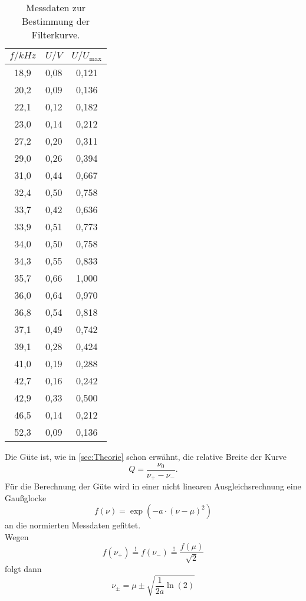 \begin{table}
  \centering
  \caption{Messdaten zur Bestimmung der Filterkurve.}
  \label{tab:filterkurve}
  \begin{tabular}{c c c}
  \toprule
  $f / \si{kHz}$	& $U / \si{V}$ & $U / U_\text{max}$\\
  \midrule
	18,9&0,08&0,121	\\
	20,2&0,09&0,136	\\
	22,1&0,12&0,182	\\
	23,0&0,14&0,212	\\
	27,2&0,20&0,311	\\
	29,0&0,26&0,394	\\
	31,0&0,44&0,667	\\
	32,4&0,50&0,758	\\
	33,7&0,42&0,636	\\
	33,9&0,51&0,773	\\
	34,0&0,50&0,758	\\
	34,3&0,55&0,833	\\
	35,7&0,66&1,000	\\
	36,0&0,64&0,970	\\
	36,8&0,54&0,818	\\
	37,1&0,49&0,742	\\
	39,1&0,28&0,424	\\
	41,0&0,19&0,288	\\
	42,7&0,16&0,242	\\
	42,9&0,33&0,500	\\
	46,5&0,14&0,212	\\
	52,3&0,09&0,136	\\
  \bottomrule
  \end{tabular}
\end{table}
Die Güte ist, wie in \autoref{sec:Theorie} schon erwähnt, die relative Breite der Kurve
\[
	Q = \frac{\nu_0}{\nu_+ - \nu_-}.
\]
Für die Berechnung der Güte wird in einer nicht linearen Ausgleichsrechnung eine
Gaußglocke
\begin{equation}
	\label{eqn:gauss-glocke}
	f(\nu) = \exp\left(-a \cdot (\nu - \mu)^2\right)
\end{equation}
an die normierten Messdaten gefittet.
\\
Wegen
\begin{equation}
	f(\nu_+) \overset{!}{=} 
	f(\nu_-) \overset{!}{=} 
	\frac{f(\mu)}{\sqrt{2}}
\end{equation}
folgt dann
\begin{equation}
	\label{eqn:nu-plus-minus}
	\nu_\pm = \mu \pm \sqrt{\frac{1}{2a} \ln(2)}
\end{equation}
